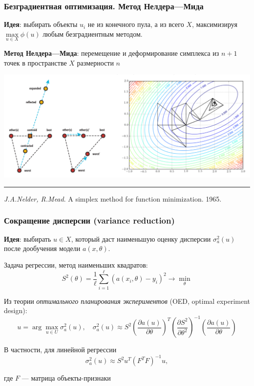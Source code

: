 \documentclass[fullscreen=true, bookmarks=true, hyperref={pdfencoding=unicode}]{beamer}
\begin{document}
\begin{frame}
  \frametitle{Безградиентная оптимизация. Метод Нелдера—Мида}

  {\bf Идея}: выбирать объекты $u_i$ не из конечного пула, а из всего $X$, максимизируя $\max\limits_{u \in X} \phi(u)$ любым безградиентным методом.

  {\bf Метод Нелдера—Мида}: перемещение и деформирование симплекса из $n+1$ точек в пространстве $X$ размерности $n$

  \begin{center}
    \includegraphics[keepaspectratio,
                     width=.85\paperwidth]{nelder_mead.png}
  \end{center}

  \noindent\rule{8cm}{0.4pt}

  {\small
  {\it J.A.Nelder, R.Mead}. A simplex method for function minimization. 1965.}

\end{frame}


\begin{frame}
  \frametitle{Сокращение дисперсии (variance reduction)}

  {\bf Идея}: выбирать $u \in X$, который даст наименьшую оценку дисперсии $\sigma_a^2(u)$ после дообучения модели $a(x, \theta)$.

  Задача регрессии, метод наименьших квадратов:
  $$ S^2(\theta) = \frac{1}{\ell} \sum\limits_{i=1}^\ell \left(a(x_i, \theta)-y_i \right)^2 \to \min\limits_{\theta} $$

  Из теории {\it оптимального планирования экспериментов} (OED, optimal experiment design):
  $$ u = \arg\max\limits_{u \in U} \sigma^2_a(u),\quad \sigma^2_a(u) \approx S^2
  \left( \frac{\partial a(u)}{\partial \theta} \right)^T
  \left( \frac{\partial S^2}{\partial \theta^2} \right)^{-1}
  \left( \frac{\partial a(u)}{\partial \theta} \right)
  $$

  В частности, для линейной регрессии
  $$ \sigma_a^2(u) \approx S^2 u^T (F^T F)^{-1} u, $$

  где $F$ — матрица объекты-признаки

\end{frame}
\end{document}
